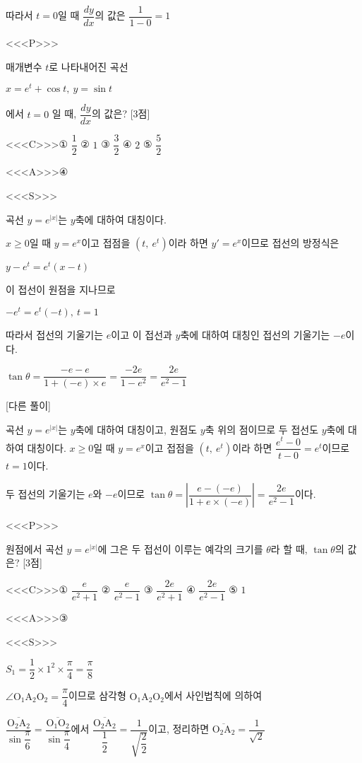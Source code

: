 \documentclass{oblivoir}
\begin{document}
따라서 $t=0$일 때 $\dfrac{dy}{dx}$의 값은 $\dfrac{1}{1-0}=1$

<<<P>>>

매개변수 $t$로 나타내어진 곡선 

$x= e^{t}+\cos t,\:y=\sin t$

에서 $t=0$ 일 때, $\dfrac{dy}{dx}$의 값은? [3점]

<<<C>>>① $\dfrac{1}{2}$ ② $1$ ③ $\dfrac{3}{2}$ ④ $2$ ⑤ $\dfrac{5}{2}$

<<<A>>>④

<<<S>>>

곡선 $y=e^{| x |}$는 $y$축에 대하여 대칭이다. 

$x\ge 0$일 때 $y=e^{x}$이고 접점을 $(t,\: e^{t})$이라 하면 $y'=e^{x}$이므로 접선의 방정식은

$y-e^{t}=e^{t}(x-t)$

이 접선이 원점을 지나므로

$-e^{t}=e^{t}(-t),\: t=1$

따라서 접선의 기울기는 $e$이고 이 접선과 $y$축에 대하여 대칭인 접선의 기울기는 $-e$이다.

$\tan\theta =\dfrac{-e-e}{1+(-e)\times e}=\dfrac{-2e}{1-e^{2}}=\dfrac{2e}{e^{2}-1}$

[다른 풀이]

곡선 $y=e^{| x |}$는 $y$축에 대하여 대칭이고, 원점도 $y$축 위의 점이므로 두 접선도 $y$축에 대하여 대칭이다. $x\ge 0$일 때 $y=e^{x}$이고 접점을 $(t,\: e^{t})$이라 하면 $\dfrac{e^{t}-0}{t-0}=e^{t}$이므로 $t=1$이다.

두 접선의 기울기는 $e$와 $-e$이므로 $\tan\theta =\left |\dfrac{e-(-e)}{1+e\times(-e)}\right | =\dfrac{2e}{e^{2}-1}$이다.

<<<P>>>

원점에서 곡선 $y=e^{| x |}$에 그은 두 접선이 이루는 예각의 크기를 $\theta$라 할 때, $\tan\theta$의 값은? [3점]

<<<C>>>① $\dfrac{e}{e^{2}+1}$ ② $\dfrac{e}{e^{2}-1}$ ③ $\dfrac{2e}{e^{2}+1}$ ④ $\dfrac{2e}{e^{2}-1}$ ⑤ $1$

<<<A>>>③

<<<S>>>

$S_{1}=\dfrac{1}{2}\times 1^{2}\times\dfrac{\pi}{4}=\dfrac{\pi}{8}$

$∠\mathrm{O}_{1}\mathrm{A}_{2}\mathrm{O}_{2}=\dfrac{\pi}{4}$이므로 삼각형 $\mathrm{O}_{1}\mathrm{A}_{2}\mathrm{O}_{2}$에서 사인법칙에 의하여

$\overline{\dfrac{\mathrm{O}_{2} \mathrm{A}_{2}}{\sin\dfrac{\pi}{6}}}=\overline{\dfrac{\mathrm{O}_{1} \mathrm{O}_{2}}{\sin\dfrac{\pi}{4}}}$에서 $\overline{\dfrac{\mathrm{O}_{2} \mathrm{A}_{2}}{\dfrac{1}{2}}}=\dfrac{1}{\sqrt{\dfrac{2}{2}}}$이고, 정리하면 $\overline{\mathrm{O_{2}A_{2}}}=\dfrac{1}{\sqrt{2}}$
\end{document}
